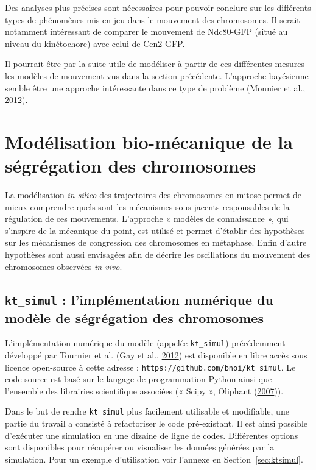 \documentclass[12pt,a4paper,twoside,openright]{book}
\begin{document}
Des analyses plus précises sont nécessaires pour pouvoir conclure sur
les différents types de phénomènes mis en jeu dans le mouvement des
chromosomes. Il serait notamment intéressant de comparer le mouvement de
Ndc80-GFP (situé au niveau du kinétochore) avec celui de Cen2-GFP.

Il pourrait être par la suite utile de modéliser à partir de ces
différentes mesures les modèles de mouvement vus dans la section
précédente. L'approche bayésienne semble être une approche intéressante
dans ce type de problème (Monnier et al.,
\hyperref[ref-Monnier2012]{2012}).

\section{Modélisation bio-mécanique de la ségrégation des
chromosomes}\label{moduxe9lisation-bio-muxe9canique-de-la-suxe9gruxe9gation-des-chromosomes}

La modélisation \emph{in silico} des trajectoires des chromosomes en
mitose permet de mieux comprendre quels sont les mécanismes sous-jacents
responsables de la régulation de ces mouvements. L'approche « modèles de
connaissance », qui s'inspire de la mécanique du point, est utilisé et
permet d'établir des hypothèses sur les mécanismes de congression des
chromosomes en métaphase. Enfin d'autre hypothèses sont aussi envisagées
afin de décrire les oscillations du mouvement des chromosomes observées
\emph{in vivo}.

\subsection{\texorpdfstring{\texttt{kt\_simul} : l'implémentation
numérique du modèle de ségrégation des
chromosomes}{kt\_simul : l'implémentation numérique du modèle de ségrégation des chromosomes}}\label{ktux5fsimul-limpluxe9mentation-numuxe9rique-du-moduxe8le-de-suxe9gruxe9gation-des-chromosomes}

L'implémentation numérique du modèle (appelée \texttt{kt\_simul})
précédemment développé par Tournier et al. (Gay et al.,
\hyperref[ref-Gay2012a]{2012}) est disponible en libre accès sous
licence open-source à cette adresse :
\texttt{https://github.com/bnoi/kt\_simul}. Le code source est basé sur
le langage de programmation Python ainsi que l'ensemble des librairies
scientifique associées (« Scipy », Oliphant
(\hyperref[ref-Oliphant2007]{2007})).

Dans le but de rendre \texttt{kt\_simul} plus facilement utilisable et
modifiable, une partie du travail a consisté à refactoriser le code
pré-existant. Il est ainsi possible d'exécuter une simulation en une
dizaine de ligne de codes. Différentes options sont disponibles pour
récupérer ou visualiser les données générées par la simulation. Pour un
exemple d'utilisation voir l'annexe en Section~\ref{sec:ktsimul}.
\end{document}
